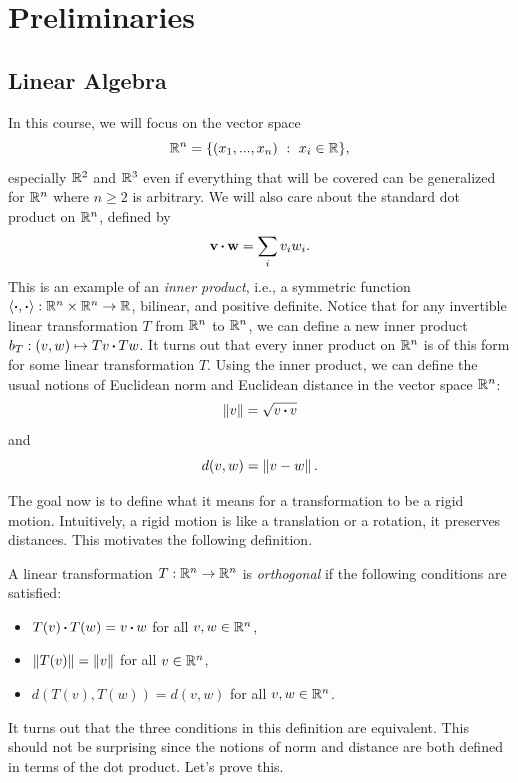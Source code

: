 \section{Preliminaries}

\subsection{Linear Algebra}

In this course, we will focus on the vector space
$$\mathbb{R}^n = \{(x_1, ..., x_n) \ : \ x_i \in \mathbb{R}\},$$
especially $\mathbb{R}^2$ and $\mathbb{R}^3$ even if everything that will be covered can be generalized for $\mathbb{R}^n$ where $n \geq 2$ is arbitrary. We will also care about the standard dot product on $\mathbb{R}^n$, defined by
$$\textbf{v} \operatorname{\boldsymbol{\cdot}} \textbf{w} = \sum_{i}v_iw_i.$$
This is an example of an \textit{inner product}, i.e., a symmetric function $\langle \operatorname{\boldsymbol{\cdot}} , \operatorname{\boldsymbol{\cdot}} \rangle : \mathbb{R}^n \times \mathbb{R}^n \to \mathbb{R}$, bilinear, and positive definite. Notice that for any invertible linear transformation $T$ from $\mathbb{R}^n$ to $\mathbb{R}^n$, we can define a new inner product $b_T : (v,w) \mapsto Tv \operatorname{\boldsymbol{\cdot}} Tw$. It turns out that every inner product on $\mathbb{R}^n$ is of this form for some linear transformation $T$. Using the inner product, we can define the usual notions of Euclidean norm and Euclidean distance in the vector space $\mathbb{R}^n$:
$$\left\lVert v \right\rVert = \sqrt{v \operatorname{\boldsymbol{\cdot}} v}$$
and 
$$d(v,w) = \left\lVert v-w \right\rVert.$$

The goal now is to define what it means for a transformation to be a rigid motion. Intuitively, a rigid motion is like a translation or a rotation, it preserves distances. This motivates the following definition.

\begin{definition}
    A linear transformation $T : \mathbb{R}^n \to \mathbb{R}^n$ is \textit{orthogonal} if the following conditions are satisfied:
    \begin{itemize}
        \item $T(v) \operatorname{\boldsymbol{\cdot}} T(w) = v \operatorname{\boldsymbol{\cdot}} w$ for all $v,w \in \mathbb{R}^n$,
        \item $\left\lVert T(v) \right\rVert = \left\lVert v \right\rVert$ for all $v \in \mathbb{R}^n$,
        \item $d(T(v), T(w)) = d(v,w)$ for all $v ,w \in \mathbb{R}^n$.
    \end{itemize}
\end{definition}

It turns out that the three conditions in this definition are equivalent. This should not be surprising since the notions of norm and distance are both defined in terms of the dot product. Let's prove this.

